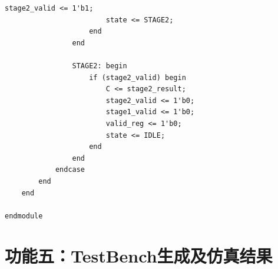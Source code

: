 \documentclass[UTF8]{ctexart}
\begin{document}
\begin{lstlisting}[frame=shadowbox,caption=fp\_multiplier\_generated.v]
                        stage2_valid <= 1'b1;
                        state <= STAGE2;
                    end
                end
                
                STAGE2: begin
                    if (stage2_valid) begin
                        C <= stage2_result;
                        stage2_valid <= 1'b0;
                        stage1_valid <= 1'b0;
                        valid_reg <= 1'b0;
                        state <= IDLE;
                    end
                end
            endcase
        end
    end

endmodule
\end{lstlisting}

\section{功能五：TestBench生成及仿真结果}
\end{document}
